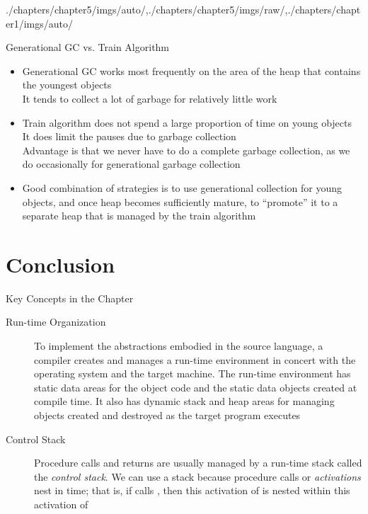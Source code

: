 \begin{graphicspathcontext}{{./chapters/chapter5/imgs/auto/},{./chapters/chapter5/imgs/raw/},{./chapters/chapter1/imgs/auto/}}
\begin{bibunit}[apalike]
\begin{frame}[background=6]{{Generational GC} vs. Train Algorithm}
	\begin{itemize}
		\item Generational GC works most frequently on the area of the heap that contains the youngest objects \\
		It tends to collect a lot of garbage for relatively little work
		\vfill
		\item Train algorithm does not spend a large proportion of time on young objects \\
		It does limit the pauses due to garbage collection \\
		Advantage is that we never have to do a complete garbage collection, as we do occasionally for generational garbage collection
		\vfill
		\item Good combination of strategies is to use generational collection  for young objects, and once heap becomes sufficiently mature, to ``promote'' it to a separate heap that is managed by the train algorithm
	\end{itemize}
\end{frame}

\section{Conclusion}
\sectiontableofcontentslide

\begin{frame}{{Key Concepts} in the Chapter}
	\begin{description}
		\item[Run-time Organization] To implement the abstractions embodied in the source language, a compiler creates and manages a run-time environment in concert with the operating system and the target machine. The run-time environment has static data areas for the object code and the static data objects created at compile time. It also has dynamic stack and heap areas for managing objects created and destroyed as the target program executes
		\item[Control Stack]  Procedure calls and returns are usually managed by a run-time stack called the \emph{control stack}. We can use a stack because procedure calls or \emph{activations} nest in time; that is, if  calls , then this activation of  is nested within this activation of 
	\end{description}
\end{frame}


\end{bibunit}
\end{graphicspathcontext}
